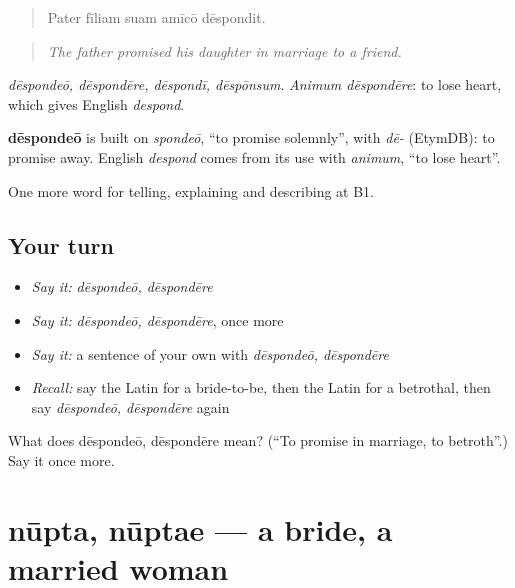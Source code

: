 \begin{quote}
Pater fīliam suam amīcō dēspondit.
\end{quote}

\begin{quote}
\emph{The father promised his daughter in marriage to a friend.}
\end{quote}

\emph{dēspondeō, dēspondēre, dēspondī, dēspōnsum}. \emph{Animum dēspondēre}: to lose heart, which gives English \emph{despond}.

\begin{cousinweb}
\textbf{dēspondeō} is built on \emph{spondeō}, \textquotedblleft{}to promise solemnly\textquotedblright{}, with \emph{dē-} (EtymDB): to promise away. English \emph{despond} comes from its use with \emph{animum}, \textquotedblleft{}to lose heart\textquotedblright{}.
\end{cousinweb}

\begin{grammarlens}[title={What you've built}]
One more word for telling, explaining and describing at B1.
\end{grammarlens}

\subsection*{Your turn}
\begin{itemize}
\raggedright
  \item \emph{Say it:} \emph{dēspondeō, dēspondēre}
  \item \emph{Say it:} \emph{dēspondeō, dēspondēre}, once more
  \item \emph{Say it:} a sentence of your own with \emph{dēspondeō, dēspondēre}
  \item \emph{Recall:} say the Latin for a bride-to-be, then the Latin for a betrothal, then say \emph{dēspondeō, dēspondēre} again
\end{itemize}

\begin{tcolorbox}[breakable,colback=teal!4,colframe=teal!35!black,title={Before you move on}]
What does dēspondeō, dēspondēre mean? (\textquotedblleft{}To promise in marriage, to betroth\textquotedblright{}.) Say it once more.
\end{tcolorbox}
\section[nūpta, nūptae]{nūpta, nūptae — a bride, a married woman}

